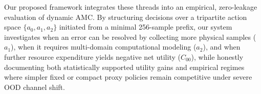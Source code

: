 Our proposed framework integrates these threads into an empirical, zero-leakage evaluation of dynamic AMC. By structuring decisions over a tripartite action space $\{a_0, a_1, a_2\}$ initiated from a minimal 256-sample prefix, our system investigates when an error can be resolved by collecting more physical samples ($a_1$), when it requires multi-domain computational modeling ($a_2$), and when further resource expenditure yields negative net utility ($C_{00}$), while honestly documenting both statistically supported utility gains and empirical regimes where simpler fixed or compact proxy policies remain competitive under severe OOD channel shift.
